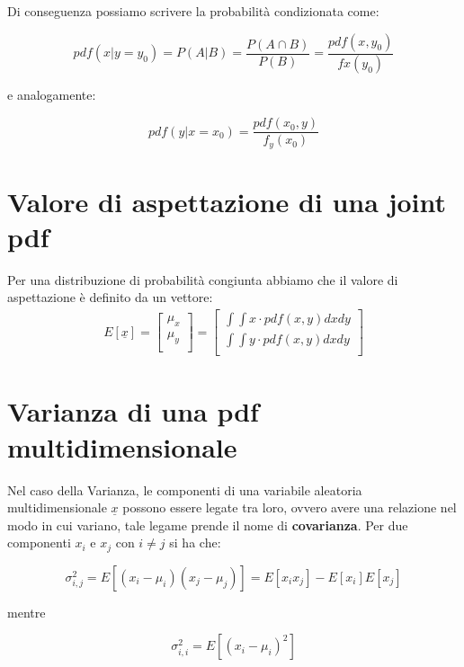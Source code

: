 Di conseguenza possiamo scrivere la probabilit\`{a} condizionata come:

\begin{equation}
	pdf(x \vert y = y_0) = P(A\vert B) = \dfrac{P(A \cap B)}{P(B)} = \dfrac{pdf(x,y_0)}{fx(y_0)}
\end{equation}

e analogamente:

\begin{equation}
	pdf(y \vert x = x_0) = \dfrac{pdf(x_0,y)}{f_y(x_0)}
\end{equation}

\section{Valore di aspettazione di una joint pdf}

Per una distribuzione di probabilit\`{a} congiunta abbiamo che il valore di aspettazione \`{e} definito da un vettore:
\begin{align}
E[\underline{x}] =
	\begin{bmatrix}
		\mu_x \\
		\mu_y \\
	\end{bmatrix}
	= 
	\begin{bmatrix}
		\int \int x \cdot pdf(x,y)dxdy \\
		\int \int y \cdot pdf(x,y)dxdy \\
	\end{bmatrix}	
\end{align}



\section{Varianza di una pdf multidimensionale}

Nel caso della Varianza, le componenti di una variabile aleatoria multidimensionale $\underline{x}$ possono essere legate tra loro, ovvero avere una relazione nel modo in cui variano, tale legame prende il nome di \textbf{covarianza}. Per due componenti $x_i$ e $x_j$ con $i \neq j$ si ha che: 

\begin{equation}
	\sigma_{i,j}^2 = E[(x_i - \mu_i)(x_j - \mu_j)] = E[x_ix_j] - E[x_i]E[x_j]
\end{equation}  	

\noindent mentre   	

\begin{equation}
	\sigma_{i,i}^2 = E[(x_i-\mu_i)^2]
\end{equation}
 
